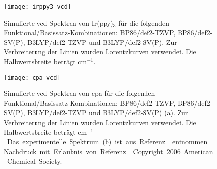 \begin{figure}[ht!]\vspace{2cm}
	\centering
	\texttt{[image: irppy3\_vcd]}
	\captionsetup{figurewithin = chapter}
	\captionsetup{font=small, labelfont=bf}\caption[Simulierte \ac{vcd}-Spektren von Ir(ppy)$_3$]{Simulierte \ac{vcd}-Spektren von Ir(ppy)$_3$ für die folgenden Funktional/Basissatz-Kombinationen: BP86/def2-TZVP, BP86/def2-SV(P), B3LYP/def2-TZVP und B3LYP/def2-SV(P). Zur Verbreiterung der Linien wurden Lorentzkurven verwendet. Die Halbwertsbreite beträgt \unit[4]{cm$^{-1}$}.}
\label{abb:irppy3_vcd}
\end{figure}
\vfill
\newpage
\begin{figure}[ht!]
	\centering
	\texttt{[image: cpa\_vcd]}
	\captionsetup{figurewithin = chapter}
	\captionsetup{font=small, labelfont=bf}\caption[Simulierte \ac{vcd}-Spektren von \ac{cpa}]{Simulierte \ac{vcd}-Spektren von \ac{cpa} für die folgenden Funktional/Basissatz-Kombinationen: BP86/def2-TZVP, BP86/def2-SV(P), B3LYP/def2-TZVP und B3LYP/def2-SV(P) \textsf{(a)}. Zur Verbreiterung der Linien wurden Lorentzkurven verwendet. Die Halbwertsbreite beträgt \unit[4]{cm$^{-1}$}. Das experimentelle Spektrum \textsf{(b)} ist aus Referenz \cite{brotin2006vibrational} entnommen. Nachdruck mit Erlaubnis von Referenz \cite{brotin2006vibrational}. Copyright 2006 American Chemical Society.}
\label{abb:cpa_vcd}
\end{figure}
\vfill
\newpage

